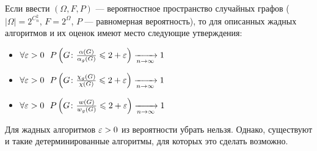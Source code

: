 \begin{theorem}
	Если ввести $(\Omega, F, P)$ --- вероятностное пространство случайных графов ($|\Omega| = 2^{C_n^2}$, $F = 2^\Omega$, $P$ --- равномерная вероятность), то для описанных жадных алгоритмов и их оценок имеют место следующие утверждения:
	\begin{itemize}
		\item \(\forall \varepsilon > 0\ \ P\left(G \colon \frac{\alpha(G)}{\alpha_g(G)} \leqslant 2 + \varepsilon\right) \xrightarrow[n \to \infty]{} 1\)
		
		\item \(\forall \varepsilon > 0\ \ P\left(G \colon \frac{\chi_g(G)}{\chi(G)} \leqslant 2 + \varepsilon\right) \xrightarrow[n \to \infty]{} 1\)
		
		\item \(\forall \varepsilon > 0\ \ P\left(G \colon \frac{w(G)}{w_g(G)} \leqslant 2 + \varepsilon\right) \xrightarrow[n \to \infty]{} 1\)
	\end{itemize}
\end{theorem}

\begin{note}
	Для жадных алгоритмов $\varepsilon > 0$ из вероятности убрать нельзя. Однако, существуют и такие детерминированные алгоритмы, для которых это сделать возможно.
\end{note}

